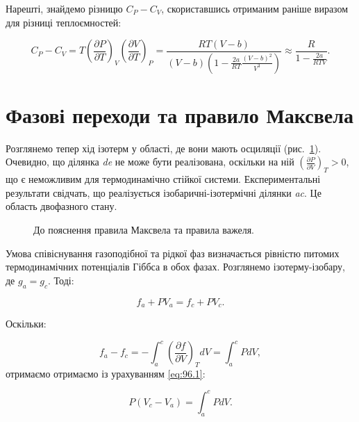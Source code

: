 Нарешті, знайдемо різницю $C_{P} - C_{V}$, скориставшись отриманим раніше виразом для різниці
теплоємностей:

\begin{equation}
C_{P} - C_{V} = T\left( \frac{\partial P}{\partial T} \right)_{V}\left( \frac{\partial V}{\partial T}
\right)_{P} = \frac{RT(V - b)}{(V - b)\left( 1 - \frac{2a}{RT}\frac{(V - b)^{2}}{V^{3}} \right)}
\approx \frac{R}{1 - \frac{2a}{RTV}}.
\label{eq:95.9}
\end{equation}

\section{Фазові переходи та правило Максвела}

Розглянемо тепер хід ізотерм у області, де вони мають осциляції (рис.~\ref{pic:8.9}). Очевидно, що ділянка \textit{de} не
може бути реалізована, оскільки на ній $\left(\frac{\partial P}{\partial V}\right)_T > 0$, що є
неможливим для термодинамічно стійкої системи. Експериментальні результати свідчать, що реалізується
ізобаричні-ізотермічні ділянки \textit{ac}. Це область двофазного стану.

\begin{figure}[h!]\centering

\caption{До пояснення правила Максвела та правила важеля.}
\label{pic:8.9}
\end{figure}


Умова співіснування газоподібної та рідкої фаз визначається рівністю питомих термодинамічних
потенціалів Гіббса в обох фазах. Розглянемо ізотерму-ізобару, де $g_a = g_c$. Тоді:

\begin{equation}\label{eq:96.1}
f_a + PV_a = f_c + PV_c.
\end{equation}

Оскільки:

\begin{equation}
f_a - f_c = -\int_{a}^{c} \left( \frac{\partial f}{\partial V} \right)_T dV = \int_{a}^{c} P dV,
\label{eq:96.2}
\end{equation}
%
отримаємо отримаємо із урахуванням \eqref{eq:96.1}:

\begin{equation}
P(V_c - V_a) = \int_{a}^{c} P dV.
\label{eq:96.3}
\end{equation}


